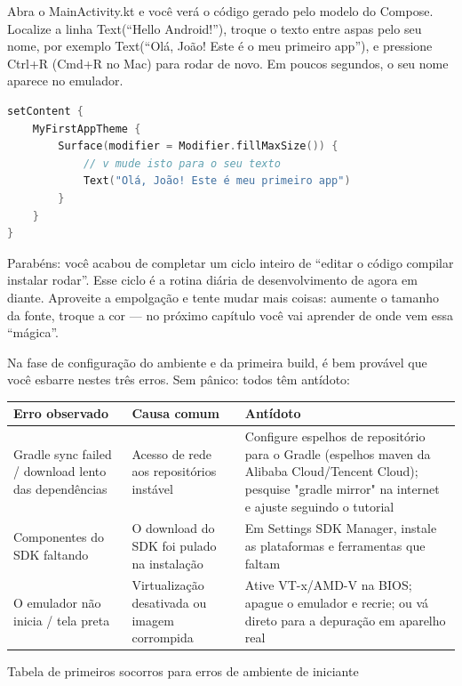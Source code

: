 
Abra o MainActivity.kt e você verá o código gerado pelo modelo do Compose. Localize a linha Text(“Hello Android!”), troque o texto entre aspas pelo seu nome, por exemplo Text(“Olá, João! Este é o meu primeiro app”), e pressione Ctrl+R (Cmd+R no Mac) para rodar de novo. Em poucos segundos, o seu nome aparece no emulador.

\begin{lstlisting}[language=Kotlin]
setContent {
    MyFirstAppTheme {
        Surface(modifier = Modifier.fillMaxSize()) {
            // v mude isto para o seu texto
            Text("Olá, João! Este é meu primeiro app")
        }
    }
}
\end{lstlisting}

Parabéns: você acabou de completar um ciclo inteiro de “editar o código compilar instalar rodar”. Esse ciclo é a rotina diária de desenvolvimento de agora em diante. Aproveite a empolgação e tente mudar mais coisas: aumente o tamanho da fonte, troque a cor — no próximo capítulo você vai aprender de onde vem essa “mágica”.


Na fase de configuração do ambiente e da primeira build, é bem provável que você esbarre nestes três erros. Sem pânico: todos têm antídoto:

\begin{center}
\begin{tabularx}{\linewidth}{|X|X|X|}
\hline
\textbf{Erro observado} & \textbf{Causa comum} & \textbf{Antídoto} \tabularnewline
\hline
Gradle sync failed / download lento das dependências & Acesso de rede aos repositórios instável & Configure espelhos de repositório para o Gradle (espelhos maven da Alibaba Cloud/Tencent Cloud); pesquise "gradle mirror" na internet e ajuste seguindo o tutorial \tabularnewline
Componentes do SDK faltando & O download do SDK foi pulado na instalação & Em Settings SDK Manager, instale as plataformas e ferramentas que faltam \tabularnewline
O emulador não inicia / tela preta & Virtualização desativada ou imagem corrompida & Ative VT-x/AMD-V na BIOS; apague o emulador e recrie; ou vá direto para a depuração em aparelho real \tabularnewline
\hline
\end{tabularx}
\end{center}

\begin{center}\small\color{gray}Tabela de primeiros socorros para erros de ambiente de iniciante\end{center}

